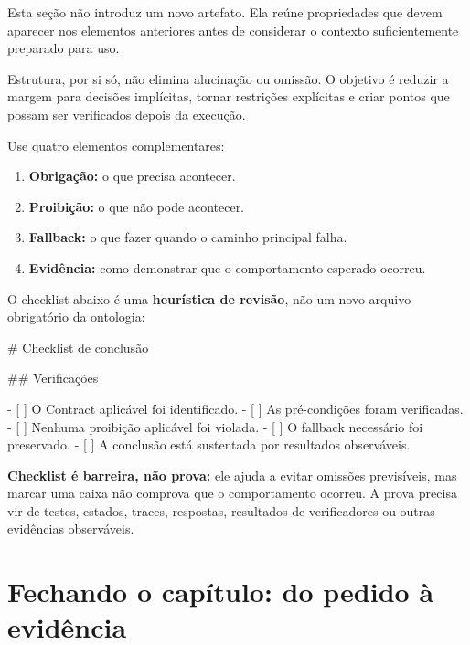 \documentclass[
  10pt,
  a4paper,
  oneside]{book}
\newenvironment{Shaded}{}{}
\newcommand{\FunctionTok}[1]{\textcolor[rgb]{0.02,0.16,0.49}{#1}}
\newcommand{\NormalTok}[1]{#1}
\newcommand{\SpecialStringTok}[1]{\textcolor[rgb]{0.73,0.40,0.53}{#1}}
\newcommand{\VariableTok}[1]{\textcolor[rgb]{0.10,0.09,0.49}{#1}}
\providecommand{\tightlist}{%
  \setlength{\itemsep}{0pt}\setlength{\parskip}{0pt}}
\renewenvironment{Shaded}{\begin{snugshade}}{\end{snugshade}}%
\begin{document}
Esta seção não introduz um novo artefato. Ela reúne propriedades que
devem aparecer nos elementos anteriores antes de considerar o contexto
suficientemente preparado para uso.

Estrutura, por si só, não elimina alucinação ou omissão. O objetivo é
reduzir a margem para decisões implícitas, tornar restrições explícitas
e criar pontos que possam ser verificados depois da execução.

Use quatro elementos complementares:

\begin{enumerate}
\def\labelenumi{\arabic{enumi}.}
\tightlist
\item
  \textbf{Obrigação:} o que precisa acontecer.
\item
  \textbf{Proibição:} o que não pode acontecer.
\item
  \textbf{Fallback:} o que fazer quando o caminho principal falha.
\item
  \textbf{Evidência:} como demonstrar que o comportamento esperado
  ocorreu.
\end{enumerate}

O checklist abaixo é uma \textbf{heurística de revisão}, não um novo
arquivo obrigatório da ontologia:

\begin{Shaded}
\begin{Highlighting}[]
\FunctionTok{\# Checklist de conclusão}

\FunctionTok{\#\# Verificações}

\SpecialStringTok{{-} }\VariableTok{[ ]}\NormalTok{ O Contract aplicável foi identificado.}
\SpecialStringTok{{-} }\VariableTok{[ ]}\NormalTok{ As pré{-}condições foram verificadas.}
\SpecialStringTok{{-} }\VariableTok{[ ]}\NormalTok{ Nenhuma proibição aplicável foi violada.}
\SpecialStringTok{{-} }\VariableTok{[ ]}\NormalTok{ O fallback necessário foi preservado.}
\SpecialStringTok{{-} }\VariableTok{[ ]}\NormalTok{ A conclusão está sustentada por resultados observáveis.}
\end{Highlighting}
\end{Shaded}

\textbf{Checklist é barreira, não prova:} ele ajuda a evitar omissões
previsíveis, mas marcar uma caixa não comprova que o comportamento
ocorreu. A prova precisa vir de testes, estados, traces, respostas,
resultados de verificadores ou outras evidências observáveis.

\hypertarget{fechando-o-capuxedtulo-do-pedido-uxe0-eviduxeancia}{%
\section{Fechando o capítulo: do pedido à
evidência}\label{fechando-o-capuxedtulo-do-pedido-uxe0-eviduxeancia}}
\end{document}
